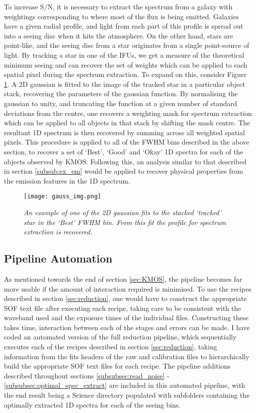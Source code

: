 \documentclass{literature}
\begin{document}
To increase S/N, it is necessary to extract the spectrum from a galaxy with weightings corresponding to where most of the flux is being emitted. Galaxies have a given radial profile, and light from each part of this profile is spread out into a seeing disc when it hits the atmosphere. On the other hand, stars are point-like, and the seeing disc from a star originates from a single point-source of light. By tracking a star in one of the IFUs, we get a measure of the theoretical minimum seeing and can recover the set of weights which can be applied to each spatial pixel during the spectrum extraction. To expand on this, consider Figure \ref{fig:fwhm_image}. A 2D gaussian is fitted to the image of the tracked star in a particular object stack, recovering the parameters of the gaussian function. By normalising the gaussian to unity, and truncating the function at a given number of standard deviations from the centre, one recovers a weighting mask for spectrum extraction which can be applied to all objects in that stack by shifting the mask centre. The resultant 1D spectrum is then recovered by summing across all weighted spatial pixels. This procedure is applied to all of the FWHM bins described in the above section, to recover a set of `Best', `Good' and `Okay' 1D spectra for each of the objects observed by KMOS. Following this, an analysis similar to that described in section \ref{subsub:ex_em} would be applied to recover physical properties from the emission features in the 1D spectrum. 


\begin{figure}[!htp]
\centering
\texttt{[image: gauss\_img.png]}
\caption{\footnotesize{\emph{An example of one of the 2D gaussian fits to the stacked `tracked' star in the `Best' FWHM bin. From this fit the profile for spectrum extraction is recovered.}}}
\label{fig:fwhm_image}
\end{figure}	


\subsection{Pipeline Automation}\label{subsec:pipeline_automation}
As mentioned towards the end of section \ref{sec:KMOS}, the pipeline becomes far more usable if the amount of interaction required is minimised. To use the recipes described in section \ref{sec:reduction}, one would have to construct the appropriate SOF text file after executing each recipe, taking care to be consistent with the waveband used and the exposure times of the individual files. Constructing these takes time, interaction between each of the stages and errors can be made. I have coded an automated version of the full reduction pipeline, which sequentially executes each of the recipes described in section \ref{sec:reduction}, taking information from the fits headers of the raw and calibration files to hierarchically build the appropriate SOF text files for each recipe. The pipeline additions described throughout sections \ref{subsubsec:read_noise} - \ref{subsubsec:optimal_spec_extract} are included in this automated pipeline, with the end result being a Science directory populated with subfolders containing the optimally extracted 1D spectra for each of the seeing bins.
\end{document}
